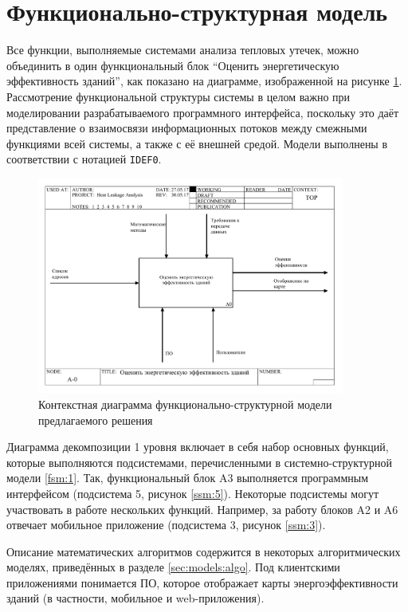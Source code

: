 \section{Функционально-структурная модель}

\par
	Все функции, выполняемые системами анализа тепловых утечек, можно объединить в один функциональный блок “Оценить энергетическую эффективность зданий”, как показано на диаграмме, изображенной на рисунке \ref{fsm:0}. Рассмотрение функциональной структуры системы в целом важно при моделировании разрабатываемого программного интерфейса, поскольку это даёт представление о взаимосвязи информационных потоков между смежными функциями всей системы, а также с её внешней средой. Модели выполнены в соответствии с нотацией \texttt{IDEF0}.

	\begin{figure}[t!]
      \centering
      \includegraphics[width=0.9\textwidth]{images/fsm/0}
      \caption{Контекстная диаграмма функционально-структурной модели предлагаемого решения}
      \label{fsm:0}
    \end{figure}

\par
    Диаграмма декомпозиции 1 уровня включает в себя набор основных функций, которые выполняются подсистемами, перечисленными в системно-структурной модели \ref{fsm:1}. Так, функциональный блок A3 выполняется программным интерфейсом (подсистема 5, рисунок \ref{ssm:5}). Некоторые подсистемы могут участвовать в работе нескольких функций. Например, за работу блоков A2 и A6 отвечает мобильное приложение (подсистема 3, рисунок \ref{ssm:3}).

	Описание математических алгоритмов содержится в некоторых алгоритмических моделях, приведённых в разделе \ref{sec:models:algo}. Под клиентскими приложениями понимается ПО, которое отображает карты энергоэффективности зданий (в частности, мобильное и web-приложения).

